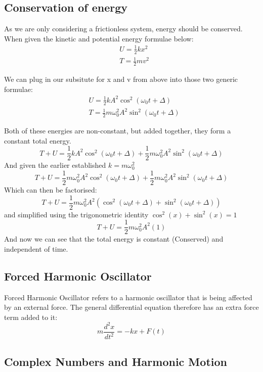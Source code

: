 \documentclass[10pt]{report}
\begin{document}
{\subsection{Conservation of energy}
\par{As we are only considering a frictionless system, energy should be conserved. When given the kinetic and potential energy formulae below:}
\begin{align*}
	& U=\frac{1}{2}kx^{2} \\
	& T=\frac{1}{2}mv^{2}
\end{align*}
\par{We can plug in our subsitute for x and v from above into those two generic formulae:}
\begin{align*}
	& U=\frac{1}{2}kA^{2}\cos^{2}\left(\omega_{0}t+\Delta\right) \\
	& T=\frac{1}{2}m\omega_{0}^{2}A^{2}\sin^{2}\left(\omega_{0}t+\Delta\right)
\end{align*}
\par{Both of these energies are non-constant, but added together, they form a constant total energy.\[
T+U=\frac{1}{2}kA^{2}\cos^{2}\left(\omega_{0}t+\Delta\right) +\frac{1}{2}m\omega_{0}^{2}A^{2}\sin^{2}\left(\omega_{0}t+\Delta\right)
\] And given the earlier established $k=m\omega_{0}^{2}$ \[
T+U=\frac{1}{2}m\omega_{0}^{2}A^{2}\cos^{2}\left(\omega_{0}t+\Delta\right) +\frac{1}{2}m\omega_{0}^{2}A^{2}\sin^{2}\left(\omega_{0}t+\Delta\right)
\] Which can then be factorised: \[
T+U=\frac{1}{2}m\omega_{0}^{2}A^{2}\left(\cos^{2}\left(\omega_{0}t+\Delta\right)+\sin^{2}\left(\omega_{0}t+\Delta\right)\right)
\] and simplified using the trigonometric identity $\cos^{2}\left(x\right)+\sin^{2}\left(x\right)=1$ \[
T+U=\frac{1}{2}m\omega_{0}^{2}A^{2}\left(1\right)
\] And now we can see that the total energy is constant (Conserved) and independent of time. }
\subsection{Forced Harmonic Oscillator}
\par{Forced Harmonic Oscillator refers to a harmonic oscillator that is being affected by an external force. The general differential equation therefore has an extra force term added to it: \[
m\frac{d^{2}x}{dt^{2}}=-kx+F\left(t\right)
\]}
\subsection{Complex Numbers and Harmonic Motion}
}
\end{document}

